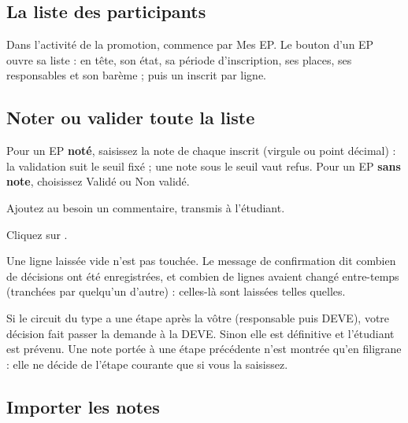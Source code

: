 \documentclass[11pt,a4paper]{article}
\begin{document}
\subsection{La liste des participants}

Dans l'activité de la promotion,  commence par \og Mes EP\fg{}. Le bouton
 d'un EP ouvre sa liste : en tête, son état, sa période d'inscription,
ses places, ses responsables et son barème ; puis un inscrit par ligne.


\subsection{Noter ou valider toute la liste}

\begin{etapes}
  \item Pour un EP \textbf{noté}, saisissez la note de chaque inscrit (virgule ou point
    décimal) : la validation suit le seuil fixé ; une note sous le seuil vaut refus. Pour un EP
    \textbf{sans note}, choisissez \og Validé\fg{} ou \og Non validé\fg{}.
  \item Ajoutez au besoin un commentaire, transmis à l'étudiant.
  \item Cliquez sur .
\end{etapes}

Une ligne laissée vide n'est pas touchée. Le message de confirmation dit combien de décisions
ont été enregistrées, et combien de lignes avaient changé entre-temps (tranchées par quelqu'un
d'autre) : celles-là sont laissées telles quelles.

\begin{astuce}
Si le circuit du type a une étape après la vôtre (\og responsable puis DEVE\fg{}), votre
décision fait passer la demande à la DEVE. Sinon elle est définitive et l'étudiant est prévenu.
Une note portée à une étape précédente n'est montrée qu'en filigrane : elle ne décide de
l'étape courante que si vous la saisissez.
\end{astuce}

\subsection{Importer les notes}
\end{document}
